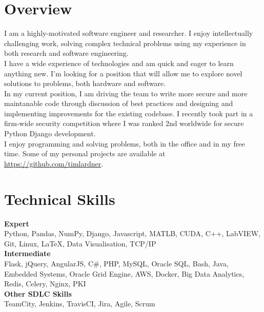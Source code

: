 
\section*{Overview}
I am a highly-motivated software engineer and researcher. I enjoy intellectually challenging work, solving complex technical problems using my experience in both research and software engineering.\\[5pt]

I have a wide experience of technologies and am quick and eager to learn anything new. I'm looking for a position that will allow me to explore novel solutions to problems, both hardware and software.\\[5pt]

In my current position, I am driving the team to write more secure and more maintanable code through discussion of best practices and designing and implementing improvements for the existing codebase. I recently took part in a firm-wide security competition where I was ranked 2nd worldwide for secure Python Django development.\\[5pt]

I enjoy programming and solving problems, both in the office and in my free time. Some of my personal projects are available at \url{https://github.com/timlardner}.

\section*{Technical Skills}
\textbf{Expert}\\
Python, Pandas, NumPy, Django, Javascript, MATLB, CUDA, C++, LabVIEW, Git, Linux, LaTeX, Data Visualisation, TCP/IP\\[5pt]
\textbf{Intermediate}\\
Flask, jQuery, AngularJS, C\#, PHP, MySQL, Oracle SQL, Bash, Java, Embedded Systems, Oracle Grid Engine, AWS, Docker, Big Data Analytics, Redis, Celery, Nginx, PKI\\[5pt]
\textbf{Other SDLC Skills}\\
TeamCity, Jenkins, TravisCI, Jira, Agile, Scrum\\[5pt] 